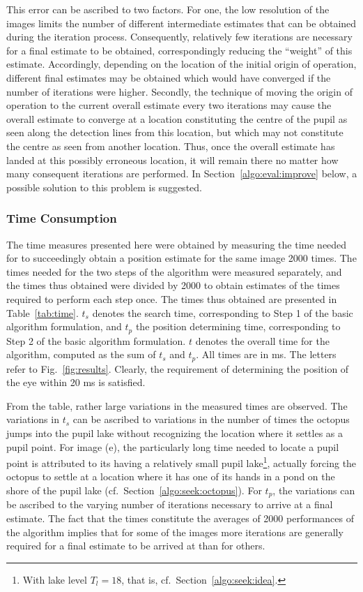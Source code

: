 This error can be ascribed to two factors.  For one, the low
resolution of the images limits the number of different intermediate
estimates that can be obtained during the iteration process.
Consequently, relatively few iterations are necessary for a final
estimate to be obtained, correspondingly reducing the ``weight'' of
this estimate.  Accordingly, depending on the location of the initial
origin of operation, different final estimates may be obtained which
would have converged if the number of iterations were higher.
Secondly, the technique of moving the origin of operation to the
current overall estimate every two iterations may cause the overall
estimate to converge at a location constituting the centre of the
pupil as seen along the detection lines from this location, but which
may not constitute the centre as seen from another location.  Thus,
once the overall estimate has landed at this possibly erroneous
location, it will remain there no matter how many consequent
iterations are performed.  In Section~\ref{algo:eval:improve} below, a
possible solution to this problem is suggested.

\subsubsection{Time Consumption}

The time measures presented here were obtained by measuring the time
needed for {\octopus} to succeedingly obtain a position estimate for
the same image 2000 times.  The times needed for the two steps of the
algorithm were measured separately, and the times thus obtained were
divided by 2000 to obtain estimates of the times required to perform
each step once.  The times thus obtained are presented in
Table~\ref{tab:time}.  $t_{s}$ denotes the search time, corresponding
to Step 1 of the basic algorithm formulation, and $t_{p}$ the position
determining time, corresponding to Step 2 of the basic algorithm
formulation.  $t$ denotes the overall time for the algorithm, computed
as the sum of $t_{s}$ and $t_{p}$.  All times are in ms.  The letters
refer to Fig.~\ref{fig:results}.  Clearly, the requirement of
determining the position of the eye within 20 ms is satisfied.

From the table, rather large variations in the measured times are
observed.  The variations in $t_{s}$ can be ascribed to variations in
the number of times the octopus jumps into the pupil lake without
recognizing the location where it settles as a pupil point.  For image
(e), the particularly long time needed to locate a pupil point is
attributed to its having a relatively small pupil lake\footnote{With
  lake level $T_{l}=18$, that is, cf.\ Section~\ref{algo:seek:idea}.},
actually forcing the octopus to settle at a location where it has one
of its hands in a pond on the shore of the pupil lake (cf.\ 
Section~\ref{algo:seek:octopus}).  For $t_{p}$, the variations can be
ascribed to the varying number of iterations necessary to arrive at a
final estimate.  The fact that the times constitute the averages of
2000 performances of the algorithm implies that for some of the images
more iterations are generally required for a final estimate to be
arrived at than for others.  

